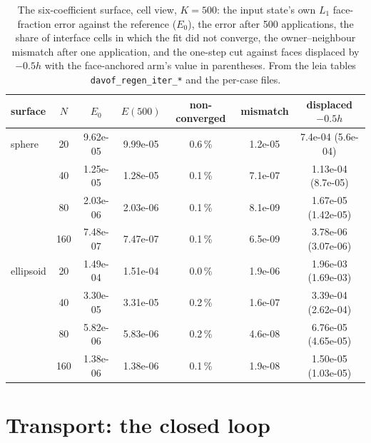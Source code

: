 \documentclass[preprint,12pt]{elsarticle}
\begin{document}
\begin{table}[htbp]
\centering
\caption{The six-coefficient surface, cell view, $K = 500$: the input state's own $L_1$ face-fraction error against the reference ($E_0$), the error after 500 applications, the share of interface cells in which the fit did not converge, the owner--neighbour mismatch after one application, and the one-step cut against faces displaced by $-0.5h$ with the face-anchored arm's value in parentheses. From the leia tables \texttt{davof\_regen\_iter\_*} and the per-case files.}
\label{tab:full}
\footnotesize
\begin{tabular}{lcccccc}
\toprule
surface & $N$ & $E_0$ & $E(500)$ & non-converged & mismatch & displaced $-0.5h$ \\
\midrule
sphere & 20 & 9.62e-05 & 9.99e-05 & 0.6\,\% & 1.2e-05 & 7.4e-04 (5.6e-04) \\
 & 40 & 1.25e-05 & 1.28e-05 & 0.1\,\% & 7.1e-07 & 1.13e-04 (8.7e-05) \\
 & 80 & 2.03e-06 & 2.03e-06 & 0.1\,\% & 8.1e-09 & 1.67e-05 (1.42e-05) \\
 & 160 & 7.48e-07 & 7.47e-07 & 0.1\,\% & 6.5e-09 & 3.78e-06 (3.07e-06) \\
ellipsoid & 20 & 1.49e-04 & 1.51e-04 & 0.0\,\% & 1.9e-06 & 1.96e-03 (1.69e-03) \\
 & 40 & 3.30e-05 & 3.31e-05 & 0.2\,\% & 1.6e-07 & 3.39e-04 (2.62e-04) \\
 & 80 & 5.82e-06 & 5.83e-06 & 0.2\,\% & 4.6e-08 & 6.76e-05 (4.65e-05) \\
 & 160 & 1.38e-06 & 1.38e-06 & 0.1\,\% & 1.9e-08 & 1.50e-05 (1.03e-05) \\
\bottomrule
\end{tabular}
\end{table}

\section{Transport: the closed loop}
\label{sec:tpf}
\end{document}
